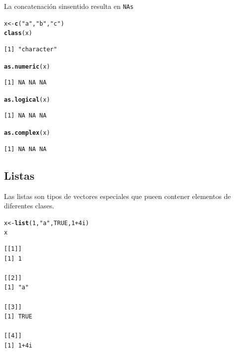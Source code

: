 \documentclass{article}\usepackage[]{graphicx}\usepackage[]{color}
\makeatletter
\newcommand{\hlnum}[1]{\textcolor[rgb]{0.686,0.059,0.569}{#1}}%
\newcommand{\hlstr}[1]{\textcolor[rgb]{0.192,0.494,0.8}{#1}}%
\newcommand{\hlopt}[1]{\textcolor[rgb]{0,0,0}{#1}}%
\newcommand{\hlstd}[1]{\textcolor[rgb]{0.345,0.345,0.345}{#1}}%
\newcommand{\hlkwb}[1]{\textcolor[rgb]{0.69,0.353,0.396}{#1}}%
\newcommand{\hlkwd}[1]{\textcolor[rgb]{0.737,0.353,0.396}{\textbf{#1}}}%
\newenvironment{kframe}{%
 \def\at@end@of@kframe{}%
 \ifinner\ifhmode%
  \def\at@end@of@kframe{\end{minipage}}%
  \begin{minipage}{\columnwidth}%
 \fi\fi%
 \def\FrameCommand##1{\hskip\@totalleftmargin \hskip-\fboxsep
 \colorbox{shadecolor}{##1}\hskip-\fboxsep
     \hskip-\linewidth \hskip-\@totalleftmargin \hskip\columnwidth}%
 \MakeFramed {\advance\hsize-\width
   \@totalleftmargin\z@ \linewidth\hsize
   \@setminipage}}%
 {\par\unskip\endMakeFramed%
 \at@end@of@kframe}
\newenvironment{knitrout}{}{} %
\makeatother
\begin{document}
      La concatenación sinsentido resulta en \texttt{NAs}
\begin{knitrout}
\color{fgcolor}\begin{kframe}
\begin{alltt}
  \hlstd{x} \hlkwb{<-} \hlkwd{c}\hlstd{(}\hlstr{"a"}\hlstd{,} \hlstr{"b"}\hlstd{,} \hlstr{"c"}\hlstd{)}
  \hlkwd{class}\hlstd{(x)}
\end{alltt}
\begin{verbatim}
[1] "character"
\end{verbatim}
\begin{alltt}
  \hlkwd{as.numeric}\hlstd{(x)}
\end{alltt}


{\ttfamily\noindent\color{warningcolor}{Warning: NAs introduced by coercion}}\begin{verbatim}
[1] NA NA NA
\end{verbatim}
\begin{alltt}
  \hlkwd{as.logical}\hlstd{(x)}
\end{alltt}
\begin{verbatim}
[1] NA NA NA
\end{verbatim}
\begin{alltt}
  \hlkwd{as.complex}\hlstd{(x)}
\end{alltt}


{\ttfamily\noindent\color{warningcolor}{Warning: NAs introduced by coercion}}\begin{verbatim}
[1] NA NA NA
\end{verbatim}
\end{kframe}
\end{knitrout}

  \subsection{Listas}
    Las listas son tipos de vectores especiales que pueen contener elementos de diferentes clases.
\begin{knitrout}
\color{fgcolor}\begin{kframe}
\begin{alltt}
  \hlstd{x} \hlkwb{<-} \hlkwd{list}\hlstd{(}\hlnum{1}\hlstd{,} \hlstr{"a"}\hlstd{,} \hlnum{TRUE}\hlstd{,} \hlnum{1} \hlopt{+} \hlnum{4i}\hlstd{)}
  \hlstd{x}
\end{alltt}
\begin{verbatim}
[[1]]
[1] 1

[[2]]
[1] "a"

[[3]]
[1] TRUE

[[4]]
[1] 1+4i
\end{verbatim}
\end{kframe}
\end{knitrout}
\end{document}
